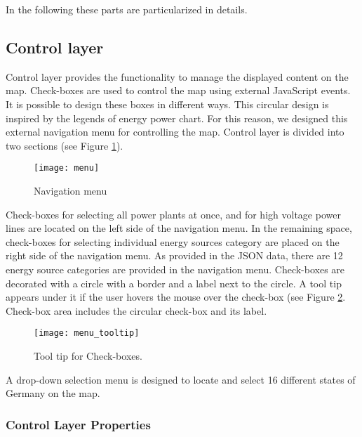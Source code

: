 In the following these parts are particularized in details.

\subsection{Control layer}
\label{sssec:controlLayer}

Control layer provides the functionality to manage the displayed content on the map. Check-boxes are used to control the map using external JavaScript events. It is possible to design these boxes in different ways. This circular design is inspired by the legends of energy power chart. For this reason, we designed this external navigation menu for controlling the map. Control layer is divided into two sections (see Figure \ref{fig:menuu}).

\begin{figure} [H]
  \begin{center}
    \texttt{[image: menu]}
    \caption{Navigation menu}
    \label{fig:menuu}
  \end{center}
\end{figure}


Check-boxes for selecting all power plants at once, and for high voltage power lines are located on the left side of the navigation menu. In the remaining space, check-boxes for selecting individual energy sources category are placed on the right side of the navigation menu. As provided in the JSON data, there are 12 energy source categories are provided in the navigation menu. Check-boxes are decorated with a circle with a border and a label next to the circle. A tool tip appears under it if the user hovers the mouse over the check-box (see Figure \ref{fig:menuTT}. Check-box area includes the circular check-box and its label. 

\begin{figure} [H]
  \begin{center}
    \texttt{[image: menu\_tooltip]}
    \caption{Tool tip for Check-boxes.}
    \label{fig:menuTT}
  \end{center}
\end{figure}

A drop-down selection menu is designed to locate and select 16 different states of Germany on the map. %


\subsubsection*{Control Layer Properties}

